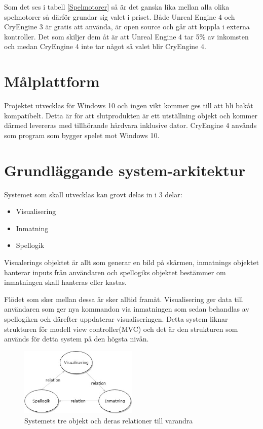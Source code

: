 \documentclass[a4paper,12pt,oneside,final]{extbook}
\begin{document}
Som det ses i tabell \ref{Spelmotorer} så är det ganska lika mellan alla olika spelmotorer så därför grundar sig valet i priset. Både Unreal Engine 4 och CryEngine 3 är gratis att använda, är open source och går att koppla i externa kontroller. Det som skiljer dem åt är att Unreal Engine 4 tar 5\% av inkomsten och medan CryEngine 4 inte tar något så valet blir CryEngine 4.

\section{Målplattform}

Projektet utvecklas för Windows 10 och ingen vikt kommer ges till att bli bakåt kompatibelt. Detta är för att slutprodukten är ett utställning objekt och kommer därmed levereras med tillhörande hårdvara inklusive dator. CryEngine 4 används som program som bygger spelet mot Windows 10.  

\section{Grundläggande system-arkitektur}
Systemet som skall utvecklas kan grovt delas in i 3 delar:
\begin{itemize}
	\item Visualisering
	\item Inmatning
	\item Spellogik
\end{itemize}
Visualerings objektet är allt som generar en bild på skärmen, inmatnings objektet hanterar inputs från användaren och spellogiks objektet bestämmer om inmatningen skall hanteras eller kastas. 

Flödet som sker mellan dessa är sker alltid framåt. Visualisering ger data till användaren som ger nya kommandon via inmatningen som sedan behandlas av spellogiken och därefter uppdaterar visualiseringen. Detta system liknar strukturen för modell view controller(MVC)\cite{Design} och det är den strukturen som används för detta system på den högsta nivån. 

\begin{figure}[h]
	\includegraphics[width=0.5\textwidth, center]{System.jpg}
	\caption{Systemets tre objekt och deras relationer till varandra}
	\label{fig:System}
\end{figure}
\end{document}
